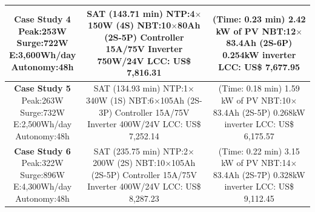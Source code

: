 \documentclass[journal]{IEEEtran}
\begin{document}
\begin{table}[!t]
\begin{scriptsize}
\begin{tabular}{|c|c|c|}
\hline
\makecell{\textbf{Case Study 4}\\Peak:253W\\Surge:722W\\E:3,600Wh/day\\Autonomy:48h} &  \makecell {SAT (143.71 min) \\NTP:4$\times$150W (4S)\\NBT:10$\times$80Ah (2S-5P)\\Controller 15A/75V\\Inverter 750W/24V \\LCC: US\$ 7,816.31} & \makecell{(Time: 0.23 min)\\2.42 kW of PV\\NBT:12$\times$83.4Ah (2S-6P)\\0.254kW inverter\\LCC: US\$ 7,677.95}\\
\hline
\makecell{\textbf{Case Study 5}\\Peak:263W\\Surge:732W\\E:2,500Wh/day\\Autonomy:48h} &  \makecell {SAT (134.93 min) \\NTP:1$\times$340W (1S)\\NBT:6$\times$105Ah (2S-3P)\\Controller 15A/75V\\Inverter 400W/24V \\LCC: US\$ 7,252.14} & \makecell{(Time: 0.18 min)\\1.59 kW of PV\\NBT:10$\times$83.4Ah (2S-5P)\\0.268kW inverter\\LCC: US\$ 6,175.57} \\
\hline
\makecell{\textbf{Case Study 6}\\Peak:322W\\Surge:896W\\E:4,300Wh/day\\Autonomy:48h} &  \makecell {SAT (235.75 min) \\NTP:2$\times$200W (2S)\\NBT:10$\times$105Ah (2S-5P)\\Controller 15A/75V\\Inverter 400W/24V \\LCC: US\$ 8,287.23} & \makecell{(Time: 0.22 min)\\3.15 kW of PV\\NBT:14$\times$83.4Ah (2S-7P)\\0.328kW inverter\\LCC: US\$ 9,112.45} \\

\end{tabular}
\end{scriptsize}
\end{table}
\end{document}
